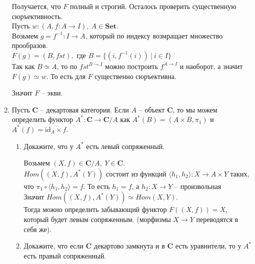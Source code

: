 \documentclass[draft]{article}
\newcommand{\cat}[1]{\mathbf{#1}}
\renewcommand{\C}{\cat{C}}
\newcommand{\Set}{\cat{Set}}
\newcommand{\fs}[1]{\mathrm{#1}}
\newcommand{\id}{\fs{id}}
\begin{document}
\begin{enumerate}
Получается, что $F$ полный и строгий. Осталось проверить существенную сюръективность.\\

Пусть $w : (A, f: A \to I), ~A\in \Set$. \\
Возьмем $g = f^{-1} : I \to A$, который по индексу возмращает множество прообразов.\\

$F(g) = (B, fst),$ где $B = \{ (i, f^{-1}(i)) ~|~ i\in I\}$\\
Так как $B \simeq A$, то по $fst^{B \to I}$ можно построить $f^{A \to I}$ и наоборот, а значит $F(g) \simeq w$. То есть для $F$ существенно сюръективна. 

Значит $F$ -- экви.

\item Пусть $\C$ -- декартовая категория.
Если $A$ -- объект $\C$, то мы можем определить функтор $A^* : \C \to \C/A$ как $A^*(B) = (A \times B, \pi_1)$ и $A^*(f) = \id_A \times f$.
\begin{enumerate}
\item Докажите, что у $A^*$ есть левый сопряженный.

Возьмем  $(X, f) \in \C/A,~Y \in \C$.\\
$Hom((X, f), A^*(Y))$ состоит из функций $\langle h_1, h_2\rangle : X \to A \times Y$ таких, что $\pi_1 \circ \langle h_1, h_2\rangle = f$. То есть $h_1 = f$, а $h_2 : X \to Y$ -- произвольная\\
Значит $Hom((X, f), A^*(Y)) \simeq Hom(X, Y)$. \\
Тогда можно определить забывающий функтор $F((X, f)) = X$, который будет левым сопряженным. (морфизмы $X \to Y$ переводятся в себя же).

\item Докажите, что если $\C$ декартово замкнута и в $\C$ есть уравнители, то у $A^*$ есть правый сопряженный.
\end{enumerate}
\end{enumerate}
\end{document}
